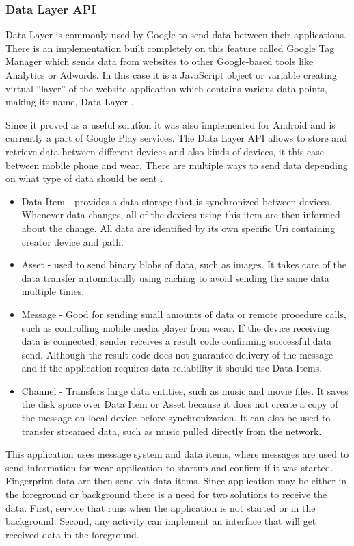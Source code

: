 \subsubsection{Data Layer API}\label{subsec:DataLayerAPI}
Data Layer is commonly used by Google to send data between their applications. There is an implementation built completely on this feature called Google Tag Manager which sends data from websites to other Google-based tools like Analytics or Adwords. In this case it is a JavaScript object or variable creating virtual \enquote{layer} of the website application which contains various data points, making its name, Data Layer \cite{GTMDL}.

Since it proved as a useful solution it was also implemented for Android and is currently a part of Google Play services. The Data Layer API allows to store and retrieve data between different devices and also kinds of devices, it this case between mobile phone and wear. There are multiple ways to send data depending on what type of data should be sent \cite{AD}.

\begin{itemize}
	\item Data Item - provides a data storage that is synchronized between devices. Whenever data changes, all of the devices using this item are then informed about the change. All data are identified by its own specific Uri containing creator device and path.
	\item Asset - used to send binary blobs of data, such as images. It takes care of the data transfer automatically using caching to avoid sending the same data multiple times.
	\item Message - Good for sending small amounts of data or remote procedure calls, such as controlling mobile media player from wear. If the device receiving data is connected, sender receives a result code confirming successful data send. Although the result code does not guarantee delivery of the message and if the application requires data reliability it should use Data Items. 
	\item Channel - Transfers large data entities, such as music and movie files. It saves the disk space over Data Item or Asset because it does not create a copy of the message on local device before synchronization. It can also be used to transfer streamed data, such as music pulled directly from the network.
\end{itemize}

This application uses message system and data items, where messages are used to send information for wear application to startup and confirm if it was started. Fingerprint data are then send via data items. Since application may be either in the foreground or background there is a need for two solutions to receive the data. First, service that runs when the application is not started or in the background. Second, any activity can implement an interface that will get received data in the foreground.

